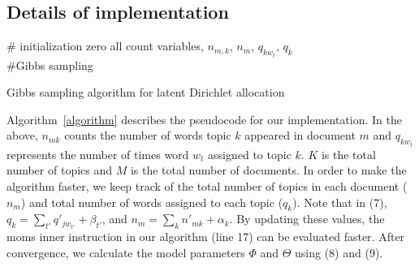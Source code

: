 \documentclass[twoside,12pt]{article}
\begin{document}
\subsection{Details of implementation}
\begin{algorithm}[h!]
\# initialization\;
 zero all count variables, $n_{m,k}$, $n_m$, $q_{kw_t}$, $q_k$ \\
\#Gibbs sampling\;

\caption{Gibbs sampling algorithm for latent Dirichlet allocation}
\label{algorithm}
\end{algorithm}

Algorithm~\ref{algorithm} describes the pseudocode for our implementation. In the above, $n_{mk}$ counts the number of words topic $k$ appeared in document $m$ and $q_{kw_t}$ represents the number of times word $w_t$ assigned to topic $k$. $K$ is the total number of topics and $M$ is the total number of documents. In order to make the algorithm faster, we keep track of the total number of topics in each document ($n_m$) and total number of words assigned to each topic ($q_k$). Note that in (7), $q_k = \sum_{t'} q'_{jw_{t'}} + \beta_{t'}$, and $n_m = \sum_k n'_{mk}+\alpha_k$. By updating these values, the moms inner instruction in our algorithm (line 17) can be evaluated faster. After convergence, we calculate the model parameters $\Phi$ and $\Theta$ using (8) and (9).
\end{document}
